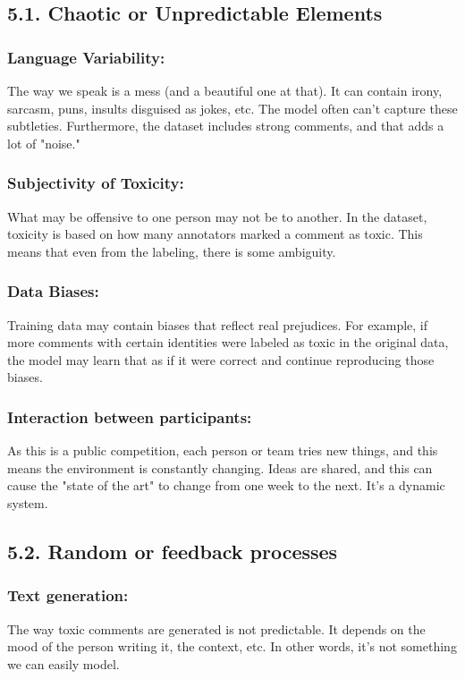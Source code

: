 \documentclass[a4paper,12pt]{article}
\begin{document}
\subsection*{5.1. Chaotic or Unpredictable Elements}

\subsubsection*{Language Variability:}
The way we speak is a mess (and a beautiful one at that). It can contain irony, sarcasm, puns, insults disguised as jokes, etc. The model often can't capture these subtleties. Furthermore, the dataset includes strong comments, and that adds a lot of "noise."

\subsubsection*{Subjectivity of Toxicity:}
What may be offensive to one person may not be to another. In the dataset, toxicity is based on how many annotators marked a comment as toxic. This means that even from the labeling, there is some ambiguity.

\subsubsection*{Data Biases:}
Training data may contain biases that reflect real prejudices. For example, if more comments with certain identities were labeled as toxic in the original data, the model may learn that as if it were correct and continue reproducing those biases.

\subsubsection*{Interaction between participants:}
As this is a public competition, each person or team tries new things, and this means the environment is constantly changing. Ideas are shared, and this can cause the "state of the art" to change from one week to the next. It's a dynamic system.

\subsection*{5.2. Random or feedback processes}

\subsubsection*{Text generation:}
The way toxic comments are generated is not predictable. It depends on the mood of the person writing it, the context, etc. In other words, it's not something we can easily model.
\end{document}
